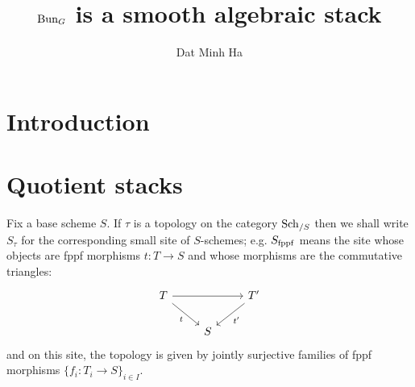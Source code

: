 

\setcounter{section}{-1}





    \title{$\mathrm{Bun}_G$ is a smooth algebraic stack}
    
    \author{Dat Minh Ha}
    \maketitle
    
    \begin{abstract}
        
    \end{abstract}
    
    {
      \hypersetup{} 
      \tableofcontents %
    }

    \section{Introduction}

    \section{Quotient stacks}
        \begin{convention}
            Fix a base scheme $S$. If $\tau$ is a topology on the category $\mathrm{Sch}_{/S}$ then we shall write $S_{\tau}$ for the corresponding small site of $S$-schemes; e.g. $S_{\mathrm{fppf}}$ means the site whose objects are fppf morphisms $t: T \to S$ and whose morphisms are the commutative triangles:
                $$
                    \begin{tikzcd}
                	T && {T'} \\
                	& S
                	\arrow["t"', from=1-1, to=2-2]
                	\arrow["{t'}", from=1-3, to=2-2]
                	\arrow[from=1-1, to=1-3]
                    \end{tikzcd}
                $$
            and on this site, the topology is given by jointly surjective families of fppf morphisms $\{f_i: T_i \to S\}_{i \in I}$.
        \end{convention}
    
